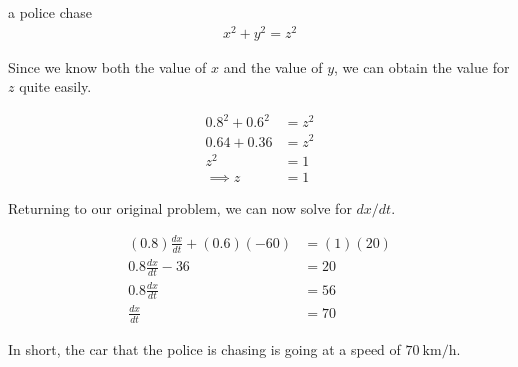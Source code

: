 \begin{examplebreak}{a police chase}
    \begin{align*}
        x^2 + y^2 = z^2
    \end{align*}

    Since we know both the value of \( x \) and the value of \( y \), we can obtain the value for \( z \) quite easily.

    \begin{align*}
        0.8^2 + 0.6^2 &= z^2 \\
        0.64 + 0.36 &= z^2 \\
        z^2 &= 1 \\
        \implies z &= 1
    \end{align*}

    Returning to our original problem, we can now solve for \( dx/dt \).

    \begin{align*}
        \left( 0.8 \right) \frac{dx}{dt} + \left( 0.6 \right) \left( -60 \right) &= \left( 1 \right) \left( 20 \right) \\
        0.8 \frac{dx}{dt} - 36 &= 20 \\
        0.8 \frac{dx}{dt} &= 56 \\
        \frac{dx}{dt} &= 70
    \end{align*}

    In short, the car that the police is chasing is going at a speed of \( \SI{70}{\kilo\meter\per\hour} \).
\end{examplebreak}

\newpage

